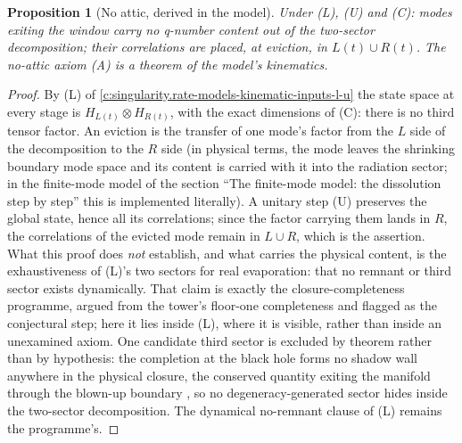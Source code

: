 \documentclass[11pt]{article}
\newtheorem{proposition}[theorem]{Proposition}
\theoremstyle{definition}
\theoremstyle{plain}
\newcommand{\changedmark}[2]{\marginpar{\raggedright\scriptsize\color{#1}#2}}
\begin{document}
\begin{proposition}[No attic, derived in the model]\label{c:singularity.no-attic-derived-model}
\changedmark{gray}{reworded}
Under (L), (U) and (C): modes exiting the window carry no q-number content out of the two-sector decomposition; their correlations are placed, at eviction, in $L(t) \cup R(t)$. The no-attic axiom (A) is a theorem of the model's kinematics.
\end{proposition}
\begin{proof}
By (L) of \ref{c:singularity.rate-models-kinematic-inputs-l-u} the state space at every stage is $H_{L(t)} \otimes H_{R(t)}$, with the exact dimensions of (C): there is no third tensor factor. An eviction is the transfer of one mode's factor from the $L$ side of the decomposition to the $R$ side (in physical terms, the mode leaves the shrinking boundary mode space and its content is carried with it into the radiation sector; in the finite-mode model of the section ``The finite-mode model: the dissolution step by step'' this is implemented literally). A unitary step (U) preserves the global state, hence all its correlations; since the factor carrying them lands in $R$, the correlations of the evicted mode remain in $L \cup R$, which is the assertion. What this proof does \emph{not} establish, and what carries the physical content, is the exhaustiveness of (L)'s two sectors for real evaporation: that no remnant or third sector exists dynamically. That claim is exactly the closure-completeness programme, argued from the tower's floor-one completeness \cite[Cor.~6.2]{ButlerT3} and flagged as the conjectural step; here it lies inside (L), where it is visible, rather than inside an unexamined axiom. One candidate third sector is excluded by theorem rather than by hypothesis: the completion at the black hole forms no shadow wall anywhere in the physical closure, the conserved quantity exiting the manifold through the blown-up boundary \cite[Thm.~8.12, Rem.~8.13]{ButlerT4}, so no degeneracy-generated sector hides inside the two-sector decomposition. The dynamical no-remnant clause of (L) remains the programme's.

\end{proof}
\end{document}
